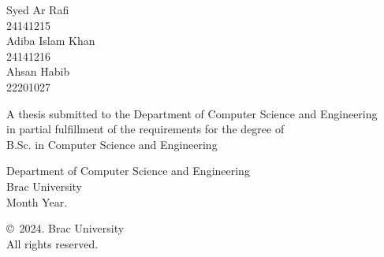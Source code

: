 \begin{titlepage}
\renewcommand*{\thepage}{Title} %

    \begin{center} 
        \vspace*{3cm} %
        
        {\fontsize{16pt}{22pt}\selectfont{InsightLens: A Vision-Language Based Accessibility Framework for Extracting and Understanding Classroom Content in Dual Languages}
        } %
        
        \vspace{1.5cm}
        
        
        \vspace{0.5cm}
        
        	Syed Ar Rafi\\
	        24141215\\
	        Adiba Islam Khan\\
	        24141216\\
	          Ahsan Habib\\
	        22201027\\

        \vspace{1.5cm}
        
        	A thesis submitted to the Department of Computer Science and Engineering\\
            in partial fulfillment of the requirements for the degree of\\
            B.Sc. in Computer Science and Engineering

        
        \vspace{2.5cm}
        
    		Department of Computer Science and Engineering\\
            Brac University\\
            Month Year.
        
        \vspace{3cm}
        
    		\copyright\ 2024. Brac University\\
            All rights reserved.
    
    \end{center}

\end{titlepage}